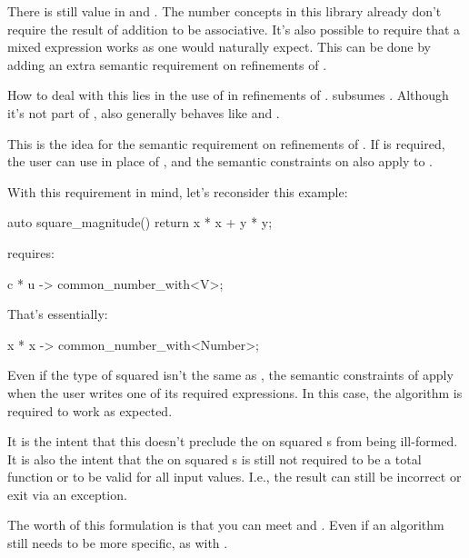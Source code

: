 \pnum
There is still value in  and .
The number concepts in this library
already don't require the result of addition to be associative.
It's also possible to require that a mixed expression works as one would naturally expect.
This can be done by adding an extra semantic requirement on refinements of .

\pnum
How to deal with this lies in the use of  in refinements of .
 subsumes .
Although it's not part of ,
 also generally behaves like  and .

\pnum
This is the idea for the semantic requirement on refinements of .
If  is required,
the user can use  in place of , and
the semantic constraints on  also apply to .

\pnum
With this requirement in mind, let's reconsider this example:
\begin{codeblock}
auto square_magnitude() { return x * x + y * y; }
\end{codeblock}
 requires:
\begin{codeblock}
{ c * u } -> common_number_with<V>;
\end{codeblock}
That's essentially:
\begin{codeblock}
{ x * x } -> common_number_with<Number>;
\end{codeblock}
Even if the type of  squared isn't the same as ,
the semantic constraints of  apply
when the user writes one of its required expressions.
In this case, the algorithm is required to work as expected.

\pnum
It is the intent that this doesn't preclude the \tcode{+} on squared s from being ill-formed.
It is also the intent that the \tcode{+} on squared s
is still not required to be a total function
or to be valid for all input values.
I.e., the result can still be incorrect or exit via an exception.

\pnum
The worth of this formulation is that you can meet  and .
Even if an algorithm still needs to be more specific, as with .
